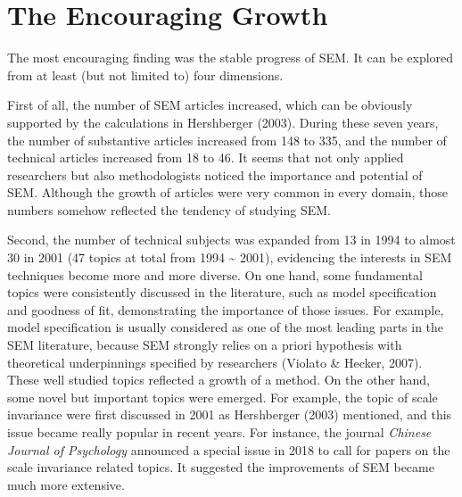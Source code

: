 \documentclass[jou]{apa6}
\theoremstyle{definition}
\theoremstyle{definition}
\theoremstyle{definition}
\theoremstyle{remark}
\begin{document}
\hypertarget{the-encouraging-growth}{%
\section{The Encouraging Growth}\label{the-encouraging-growth}}

The most encouraging finding was the stable progress of SEM. It can be
explored from at least (but not limited to) four dimensions.

\setlength{\parindent}{4ex}

First of all, the number of SEM articles increased, which can be
obviously supported by the calculations in Hershberger (2003). During
these seven years, the number of substantive articles increased from 148
to 335, and the number of technical articles increased from 18 to 46. It
seems that not only applied researchers but also methodologists noticed
the importance and potential of SEM. Although the growth of articles
were very common in every domain, those numbers somehow reflected the
tendency of studying SEM.

Second, the number of technical subjects was expanded from 13 in 1994 to
almost 30 in 2001 (47 topics at total from 1994 \textasciitilde{} 2001),
evidencing the interests in SEM techniques become more and more diverse.
On one hand, some fundamental topics were consistently discussed in the
literature, such as model specification and goodness of fit,
demonstrating the importance of those issues. For example, model
specification is usually considered as one of the most leading parts in
the SEM literature, because SEM strongly relies on a priori hypothesis
with theoretical underpinnings specified by researchers (Violato \&
Hecker, 2007). These well studied topics reflected a growth of a method.
On the other hand, some novel but important topics were emerged. For
example, the topic of scale invariance were first discussed in 2001 as
Hershberger (2003) mentioned, and this issue became really popular in
recent years. For instance, the journal \emph{Chinese Journal of
Psychology} announced a special issue in 2018 to call for papers on the
scale invariance related topics. It suggested the improvements of SEM
became much more extensive.
\end{document}
